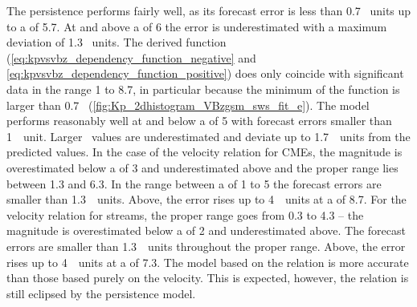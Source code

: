 The persistence performs fairly well, as its forecast error is less than 0.7~\Kp{} units up to a \Kp{} of 5.7. At and above a \Kp{} of 6 the error is underestimated with a maximum deviation of 1.3~\Kp{} units.
The derived \vBz{} function (\ref{eq:kpvsvbz_dependency_function_negative} and \ref{eq:kpvsvbz_dependency_function_positive}) does only coincide with significant data in the \Kp{} range 1 to 8.7, in particular because the minimum of the \vBz{} function is larger than 0.7~\Kp{} (\autoref{fig:Kp_2dhistogram_VBzgsm_sws_fit_e}). The model performs reasonably well at and below a \Kp{} of 5 with forecast errors smaller than 1~\Kp~unit. Larger \Kp~values are underestimated and deviate up to 1.7~\Kp~units from the predicted values.
In the case of the velocity relation for CMEs, the \Kp{} magnitude is overestimated below a \Kp{} of 3 and underestimated above and the proper range lies between 1.3 and 6.3. In the range between a \Kp{} of 1 to 5 the forecast errors are smaller than 1.3~\Kp~units. Above, the error rises up to 4~\Kp~units at a \Kp{} of 8.7.
For the velocity relation for streams, the proper range goes from 0.3 to 4.3 -- the magnitude is overestimated below a \Kp{} of 2 and underestimated above. The forecast errors are smaller than 1.3~\Kp~units throughout the proper range. Above, the error rises up to 4~\Kp~units at a \Kp{} of 7.3.
The model based on the \vBz{} relation is more accurate than those based purely on the velocity. This is expected, however, the \vBz{} relation is still eclipsed by the persistence model.

